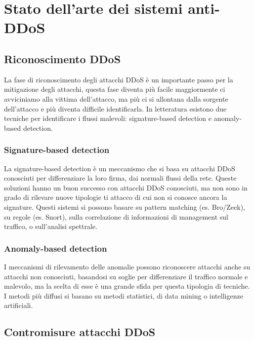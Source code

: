 \chapter{Stato dell'arte dei sistemi anti-DDoS}

\section{Riconoscimento DDoS}

La fase di riconoscimento degli attacchi DDoS è un importante passo per la mitigazione degli attacchi, questa fase diventa più facile maggiormente ci avviciniamo alla vittima dell'attacco, ma più ci si allontana dalla sorgente dell'attacco e più diventa difficile identificarla. In letteratura esistono due tecniche per identificare i flussi malevoli: signature-based detection e anomaly-based detection.

\subsection{Signature-based detection}

La signature-based detection è un meccanismo che si basa su attacchi DDoS conosciuti per differenziare la loro firma, dai normali flussi della rete. Queste soluzioni hanno un buon successo con attacchi DDoS conosciuti, ma non sono in grado di rilevare nuove tipologie ti attacco di cui non si conosce ancora la signature. Questi sistemi si possono basare su pattern matching (es. Bro/Zeek), su regole (es. Snort), sulla correlazione di informazioni di management sul traffico, o sull'analisi spettrale.

\subsection{Anomaly-based detection}

I meccanismi di rilevamento delle anomalie possono riconoscere attacchi anche su attacchi non conosciuti, basandosi su soglie per differenziare il traffico normale e malevolo, ma la scelta di esse è una grande sfida per questa tipologia di tecniche.
I metodi più diffusi si basano su metodi statistici, di data mining o intelligenze artificiali.

\section{Contromisure attacchi DDoS}

